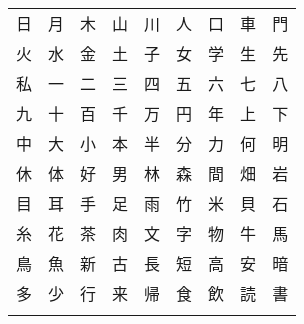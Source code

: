 \documentclass{article}
\newcommand{\tn}{\tabularnewline}
\begin{document}
\begin{CJK}{UTF8}{meiryo}
  \fontsize{18}
  \selectfont
  \begin{center}
    \begin{tabular}{x{1cm}x{1cm}x{1cm}x{1cm}x{1cm}x{1cm}x{1cm}x{1cm}x{1cm}}
      日&月&木&山&川&人&口&車&門\tn
      火&水&金&土&子&女&学&生&先\tn
      私&一&二&三&四&五&六&七&八\tn
      九&十&百&千&万&円&年&上&下\tn
      中&大&小&本&半&分&力&何&明\tn
      休&体&好&男&林&森&間&畑&岩\tn
      目&耳&手&足&雨&竹&米&貝&石\tn
      糸&花&茶&肉&文&字&物&牛&馬\tn
      鳥&魚&新&古&長&短&高&安&暗\tn
      多&少&行&来&帰&食&飲&読&書\tn
      &&&&&&&&
    
    \end{tabular}
  \end{center}
\end{CJK}
\end{document}
